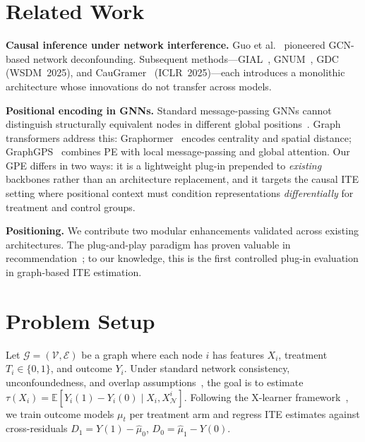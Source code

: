 \documentclass[sigconf,anonymous,review]{acmart}
\begin{document}
\section{Related Work}\label{sec:related}

\textbf{Causal inference under network interference.}
Guo et al.~\cite{guo2020learning} pioneered GCN-based network deconfounding. Subsequent methods---GIAL~\cite{chu2021graph}, GNUM~\cite{zhu2023gnum}, GDC~\cite{hu2025gdc} (WSDM~2025), and CauGramer~\cite{wu2025caugramer} (ICLR~2025)---each introduces a monolithic architecture whose innovations do not transfer across models.

\textbf{Positional encoding in GNNs.}
Standard message-passing GNNs cannot distinguish structurally equivalent nodes in different global positions~\cite{velickovic2017graph}. Graph transformers address this: Graphormer~\cite{ying2021graphormer} encodes centrality and spatial distance; GraphGPS~\cite{rampasek2022graphgps} combines PE with local message-passing and global attention. Our GPE differs in two ways: it is a lightweight plug-in prepended to \emph{existing} backbones rather than an architecture replacement, and it targets the causal ITE setting where positional context must condition representations \emph{differentially} for treatment and control groups.

\textbf{Positioning.} We contribute two modular enhancements validated across existing architectures. The plug-and-play paradigm has proven valuable in recommendation~\cite{zheng2025lighterx}; to our knowledge, this is the first controlled plug-in evaluation in graph-based ITE estimation.

\section{Problem Setup}\label{sec:prelim}

Let $\mathcal{G} = (\mathcal{V}, \mathcal{E})$ be a graph where each node $i$ has features $X_i$, treatment $T_i \in \{0,1\}$, and outcome $Y_i$. Under standard network consistency, unconfoundedness, and overlap assumptions~\cite{guo2020learning}, the goal is to estimate $\tau(X_i) = \mathbb{E}[Y_i(1) - Y_i(0) \mid X_i, X_{\mathcal{N}}^{i}]$. Following the X-learner framework~\cite{kunzel2019metalearners}, we train outcome models $\mu_t$ per treatment arm and regress ITE estimates against cross-residuals $D_1 = Y(1) - \hat{\mu}_0$, $D_0 = \hat{\mu}_1 - Y(0)$.
\end{document}

